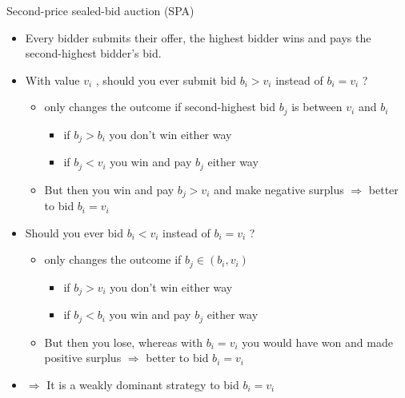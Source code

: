 \documentclass[bigger]{beamer}
\newcommand{\Ra}{\Rightarrow} \newcommand{\ra}{\rightarrow} \newcommand{\Lra}{\Leftrightarrow}
\begin{document}
\begin{frame}[label={sec:org0ba46aa}]{Second-price sealed-bid auction (SPA)}
\begin{itemize}
\item Every bidder submits their offer, the highest bidder wins and pays the second-highest bidder’s bid.
\item With value \(v_i\) , should you ever submit bid \(b_i > v_i\) instead of \(b_i = v_i\) ?
\begin{itemize}
\item only changes the outcome if second-highest bid \(b_j\) is between \(v_i\) and \(b_i\)
\begin{itemize}
\item if \(b_j > b_i\) you don’t win either way
\item if \(b_j < v_i\) you win and pay \(b_j\) either way
\end{itemize}
\item But then you win and pay \(b_j > v_i\) and make negative surplus \(\Ra\)  better to bid \(b_i = v_i\)
\pause
\end{itemize}
\item Should you ever bid \(b_i < v_i\) instead of \(b_i = v_i\) ?
\begin{itemize}
\item only changes the outcome if \(b_j \in (b_i , v_i )\)
\begin{itemize}
\item if \(b_j > v_i\) you don’t win either way
\item if \(b_j < b_i\) you win and pay \(b_j\) either way
\end{itemize}
\item But then you lose, whereas with \(b_i = v_i\) you would have won and made positive surplus \(\Ra\) better to bid \(b_i = v_i\)
\end{itemize}
\item \(\Ra\) It is a weakly dominant strategy to bid \(b_i = v_i\)
\end{itemize}
\end{frame}
\end{document}
